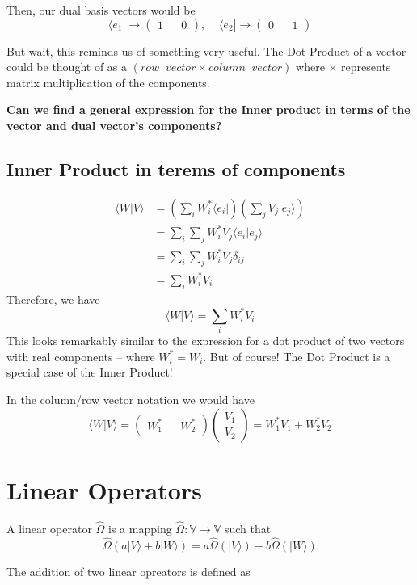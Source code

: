 \documentclass[twoside]{article}
\newcommand{\ket}[1]{|#1 \rangle}
\newcommand{\bra}[1]{\langle #1|}
\newcommand{\inner}[2]{\langle #1 | #2 \rangle}
\newcommand{\V}{\mathbb{V}}
\newcommand{\oper}{\hat{\Omega}}
\begin{document}
Then, our dual basis vectors would be 
\[ \bra{e_1} \rightarrow \begin{pmatrix} 1 && 0 \end{pmatrix},\;\;\;\; \bra{e_2} \rightarrow \begin{pmatrix} 0 && 1 \end{pmatrix} \]

But wait, this reminds us of something very useful. The Dot Product of a vector could be thought of as a $(row\;\;vector \times column\;\;vector)$ where $\times$ represents matrix multiplication of the components.

\textbf{Can we find a general expression for the Inner product in terms of the vector and dual vector's components?}

\subsection*{Inner Product in terems of components}
\begin{align*}
   \inner{W}{V} &= \left( \sum_i W_i^{*} \bra{e_i} \right) \left( \sum_j V_j \ket{e_j} \right) \\
                &= \sum_i \sum_j W_i^{*} V_j \inner{e_i}{e_j} \\
                &= \sum_i \sum_j W_i^{*} V_j \delta_{ij} \\
                &= \sum_i  W_i^{*} V_i
\end{align*}
Therefore, we have 
\[ \boxed{\inner{W}{V} = \sum_i  W_i^{*} V_i} \]
This looks remarkably similar to the expression for a dot product of two vectors with real components -- where $W_i^* = W_i$. But of course! The Dot Product is a special case of the Inner Product!

In the column/row vector notation we would have 
\[ \inner{W}{V} = \begin{pmatrix} W_1^* && W_2^* \end{pmatrix} \begin{pmatrix} V_1 \\ V_2 \end{pmatrix}  = W_1^* V_1 + W_2^* V_2 \]

\section{Linear Operators}
A linear operator $\oper$ is a mapping $\oper : \V \rightarrow \V$ such that 
\[ \oper(a\ket{V} + b\ket{W}) = a\oper(\ket{V}) + b\oper(\ket{W}) \]

The addition of two linear opreators is defined as
\end{document}
